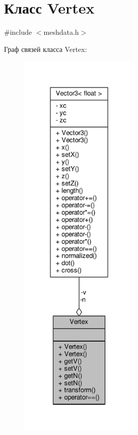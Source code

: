 \hypertarget{class_vertex}{}\section{Класс Vertex}
\label{class_vertex}


{\ttfamily \#include $<$meshdata.\+h$>$}



Граф связей класса Vertex\+:
\nopagebreak
\begin{figure}[H]
\begin{center}
\leavevmode
\includegraphics[height=550pt]{d3/d29/class_vertex__coll__graph}
\end{center}
\end{figure}
